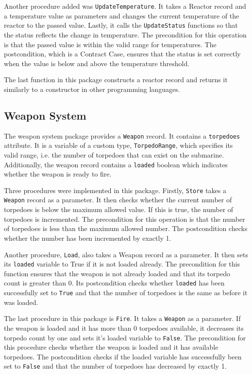 \documentclass{llncs}
\begin{document}
Another procedure added was \texttt{UpdateTemperature}. It takes a Reactor record and a temperature value as parameters and changes the current temperature of the reactor to the passed value. Lastly, it calls the \texttt{UpdateStatus} functions so that the status reflects the change in temperature. The precondition for this operation is that the passed value is within the valid range for temperatures. The postcondition, which is a Contract Case, ensures that the status is set correctly when the value is below and above the temperature threshold.

The last function in this package constructs a reactor record and returns it similarly to a constructor in other programming languages.

\subsection{Weapon System}
The weapon system package provides a \texttt{Weapon} record. It contains a \texttt{torpedoes} attribute. It is a variable of a custom type, \texttt{TorpedoRange}, which specifies its valid range, i.e. the number of torpedoes that can exist on the submarine. Additionally, the weapon record contains a \texttt{loaded} boolean which indicates whether the weapon is ready to fire. 

Three procedures were implemented in this package. Firstly, \texttt{Store} takes a \texttt{Weapon} record as a parameter. It then checks whether the current number of torpedoes is below the maximum allowed value. If this is true, the number of torpedoes is incremented. The precondition for this operation is that the number of torpedoes is less than the maximum allowed number. The postcondition checks whether the number has been incremented by exactly 1.

Another procedure, \texttt{Load}, also takes a Weapon record as a parameter. It then sets its \texttt{loaded} variable to True if it is not loaded already. The precondition for this function ensures that the weapon is not already loaded and that its torpedo count is greater than 0. Its postcondition checks whether \texttt{loaded} has been successfully set to \texttt{True} and that the number of torpedoes is the same as before it was loaded.

The last procedure in this package is \texttt{Fire}. It takes a \texttt{Weapon} as a parameter. If the weapon is loaded and it has more than 0 torpedoes available, it decreases its torpedo count by one and sets it's loaded variable to \texttt{False}. The precondition for this procedure checks whether the weapon is loaded and it has available torpedoes. The postcondition checks if the loaded variable has successfully been set to \texttt{False} and that the number of torpedoes has decreased by exactly 1.
\end{document}
